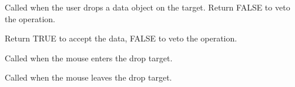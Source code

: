 \label{wxdroptargetondrop}


Called when the user drops a data object on the target. Return FALSE to veto the operation.







Return TRUE to accept the data, FALSE to veto the operation.

\label{wxdroptargetonenter}


Called when the mouse enters the drop target.

\label{wxdroptargetonleave}


Called when the mouse leaves the drop target.


